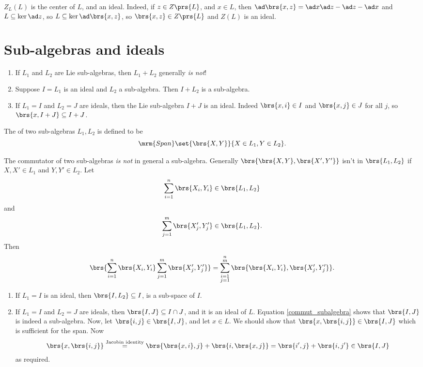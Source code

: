 \documentclass[10pt,a4paper,twoside,openany,hidelinks]{book}
\begin{document}
\begin{remark}
$Z_L(L)$ is the center of $L$, and an ideal.%
Indeed, if $z \in Z\prs{L}$, and $x \in L$, then $\ad\brs{x,z} = \ad x \ad z - \ad z - \ad x$ and $L \subseteq \ker \ad z$, so $L \subseteq \ker \ad \brs{x,z}$, so $\brs{x,z} \in Z\prs{L}$ and $Z(L)$ is an ideal.
\end{remark}
\section{Sub-algebras and ideals}
\begin{remark}
\begin{enumerate}
\item If $L_1$ and $L_2$ are Lie sub-algebras, then $L_1 + L_2$ generally \emph{is not}!
\item Suppose $I = L_1$ is an ideal and $L_2$ a sub-algebra. Then $I + L_2$ is a sub-algebra.
\item If $L_1 = I$ and $L_2 = J$ are ideals, then the Lie sub-algebra $I+J$ is an ideal.
Indeed $\brs{x,i} \in I$ and $\brs{x,j} \in J$ for all $j$, so $\brs{x,I+J} \subseteq I+J$.
\end{enumerate}
\end{remark}
\begin{definition}
The  of two sub-algebras $L_1,L_2$ is defined to be
\[\mrm{Span}\set{\brs{X,Y}}{X \in L_1, Y \in L_2} \text{.}\]
\end{definition}
\begin{remark}
The commutator of two sub-algebras \emph{is not} in general a sub-algebra. Generally $\brs{\brs{X,Y},\brs{X',Y'}}$ isn't in $\brs{L_1, L_2}$ if $X,X' \in L_1$ and $Y,Y' \in L_2$.
Let \[\sum_{i=1}^n \brs{X_i, Y_i} \in \brs{L_1, L_2}\] and \[\sum_{j=1}^m \brs{X_j',Y_j'} \in \brs{L_1, L_2}\text{.}\]
Then
\begin{equation}\label{commut_subalgebra}
\brs{\sum_{i=1}^n \brs{X_i,Y_i} \sum_{j=1}^m \brs{X_j',Y_j'}} = \sum_{\substack{i=1 \\ j=1}}^{\substack{n \\ m}} \brs{\brs{X_i,Y_i},\brs{X_j',Y_j'}}\text{.}
\end{equation}
\begin{enumerate}
\item If $L_1 = I$ is an ideal, then $\brs{I,L_2} \subseteq I$, is a sub-space of $I$.
\item If $L_1 = I$ and $L_2 = J$ are ideals, then $\brs{I,J} \subseteq I \cap J$, and it is an ideal of $L$.
Equation \ref{commut_subalgebra} shows that $\brs{I,J}$ is indeed a sub-algebra. Now, let $\brs{i,j} \in \brs{I,J}$, and let $x \in L$. We should show that $\brs{x,\brs{i,j}} \in \brs{I,J}$ which is sufficient for the span.
Now
\begin{align*}
\brs{x,\brs{i,j}} \stackrel{\text{Jacobin identity}}{=} \brs{\brs{x,i},j} + \brs{i,\brs{x,j}} = \brs{i',j} + \brs{i,j'} \in \brs{I,J}
\end{align*}
as required.
\end{enumerate}
\end{remark}
\end{document}
